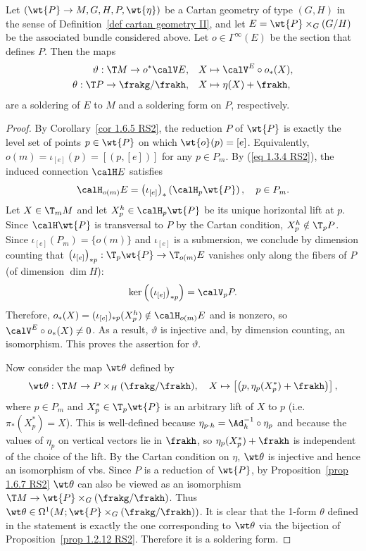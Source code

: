 \begin{prop}
    Let $(\wt{P}\to M,G,H,P,\wt{\eta})$ be a Cartan geometry of type $(G,H)$ in the sense of Definition~\ref{def cartan geometry II}, and let $E=\wt{P}\times_G (G\slash H)$ be the associated bundle considered above. Let $o\in\Gamma^\infty(E)$ be the section that defines $P$. Then the maps
    \begin{align}
        \vartheta: \T M\to o^\ast\calV E,\quad &X\mapsto \calV^E\circ o_\ast(X),\\
        \theta:\T P\to \frakg\slash\frakh, \quad &X\mapsto \eta(X)+\frakh,
    \end{align}
    are a soldering of $E$ to $M$ and a soldering form on $P$, respectively.
\end{prop}
\begin{proof}
    By Corollary~\ref{cor 1.6.5 RS2}, the reduction $P$ of $\wt{P}$ is exactly the level set of points $p\in\wt{P}$ on which $\wt{o}(p)=[e]$. Equivalently, $o(m)=\iota_{[e]}(p)=[(p,[e])]$ for any $p\in P_m$. By (\ref{eq 1.3.4 RS2}), the induced connection $\calH E$ satisfies 
    \[\calH_{o(m)}E=\left(\iota_{[e]}\right)_\ast\left(\calH_p \wt{P}\right),\quad p\in P_m.\]
    Let $X\in \T_mM$ and let $X^h_p\in \calH_p \wt{P}$ be its unique horizontal lift at $p$. Since $\calH \wt{P}$ is transversal to $P$ by the Cartan condition, $X^h_p\notin \T_p P$. Since $\iota_{[e]}(P_m)=\{o(m)\}$ and $\iota_{[e]}$ is a submersion, we conclude by dimension counting that $\left(\iota_{[e]}\right)_{\ast p}:\T_p\wt{P}\to \T_{o(m)}E$ vanishes only along the fibers of $P$ (of dimension $\dim H$):
    \[\ker\left(\left(\iota_{[e]}\right)_{\ast p}\right)=\calV_p P.\]
    Therefore, $o_\ast(X)=(\iota_{[e]})_{\ast p}(X_p^h)\notin \calH_{o(m)}E$ and is nonzero, so $\calV^E\circ o_\ast(X)\neq 0$. As a result, $\vartheta$ is injective and, by dimension counting, an isomorphism. This proves the assertion for $\vartheta$.

    Now consider the map $\wt\theta$ defined by 
    \[\wt\theta:\T M\to P\times_H (\frakg\slash\frakh),\quad X\mapsto \left[\left(p,\eta_p(X^\ast_p)+\frakh\right)\right],\]
    where $p\in P_m$ and $X^\ast_p\in \T_p\wt{P}$ is an arbitrary lift of $X$ to $p$ (i.e.\ $\pi_\ast(X^\ast_p)=X$). This is well-defined because $\eta_{p\cdot h}=\Ad_h^{-1}\circ\eta_p$ and because the values of $\eta_p$ on vertical vectors lie in $\frakh$, so $\eta_p(X^\ast_p)+\frakh$ is independent of the choice of the lift. By the Cartan condition on $\eta$, $\wt\theta$ is injective and hence an isomorphism of \glspl{vb}. Since $P$ is a reduction of $\wt{P}$, by Proposition~\ref{prop 1.6.7 RS2} $\wt\theta$ can also be viewed as an isomorphism $\T M\to \wt{P}\times_G (\frakg\slash\frakh)$. Thus $\wt\theta\in\Omega^1(M;\wt{P}\times_G (\frakg\slash\frakh))$. It is clear that the 1-form $\theta$ defined in the statement is exactly the one corresponding to $\wt\theta$ via the bijection of Proposition~\ref{prop 1.2.12 RS2}. Therefore it is a soldering form.
\end{proof}

